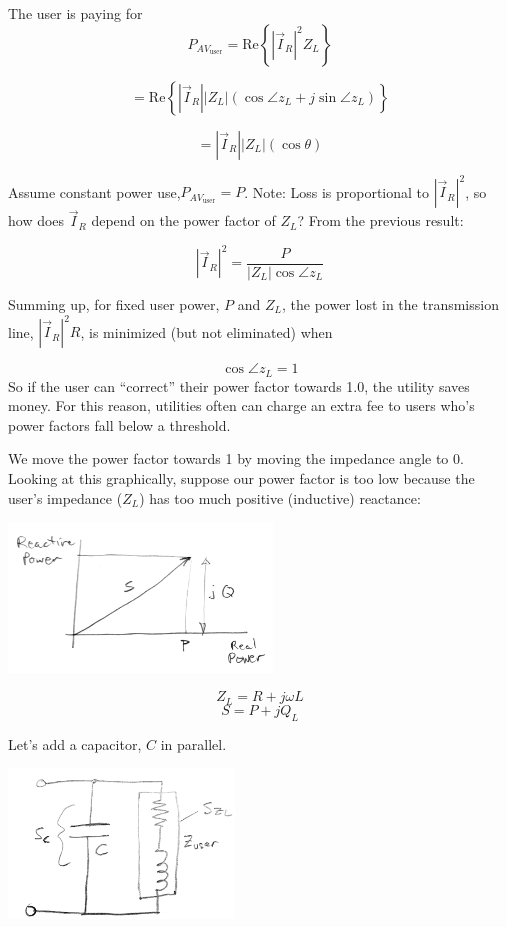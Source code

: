 The user is paying for
\[
P_{AV_{\text{user}}} = \text{Re}\left\{ |\vec{I}_R|^2 Z_L \right\}
\]

\[
= \text{Re}\left\{ |\vec{I}_R| |Z_L| (\cos \angle z_L + j \sin \angle z_L) \right\}
\]

\[
= |\vec{I}_R| |Z_L| (\cos \theta)
\]

\noindent Assume constant power use,$P_{AV_{\text{user}}} = P$.
Note: Loss is proportional to $|\vec{I}_R|^2$,
so how does $\vec{I}_R$ depend on the power factor of $Z_L$?
From the previous result:

\[
|\vec{I}_R|^2 = \frac{P}{|Z_L| \cos \angle z_L}
\]

Summing up, for fixed user power, $P$ and $Z_L$, the power lost in
the transmission line, $|\vec{I}_R|^2 R$, is minimized (but not eliminated) when

\[
\cos \angle z_L = 1
\]
So if the user can ``correct'' their power factor towards 1.0,
the utility saves money.
For this reason, utilities often can charge
an extra fee to users who's power factors fall below a  threshold.

We move the power factor towards 1 by moving the
impedance angle to 0.
Looking at this graphically, suppose our power factor is too low because
the user's impedance ($Z_L$) has too much positive (inductive) reactance:

\vspace{0.15in}
\includegraphics[width=70mm]{figsChapt03/KM41864.png}

\[
Z_L = R + j\omega L
\]
\[
S = P + jQ_L
\]



Let's add a capacitor, $ C$  in parallel.

\vspace{0.1in}
\includegraphics[width=60mm]{figsChapt03/ID44718.png}
\vspace{0.1in}

